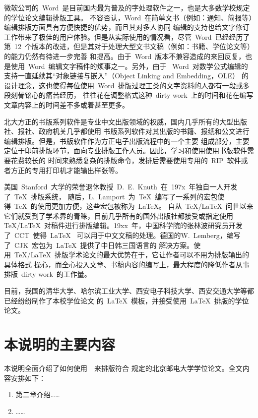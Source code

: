 微软公司的~Word~是目前国内最为普及的字处理软件之一，也是大多数学校规定的学位论文编辑排版工具。
不容否认，Word~在简单文书（例如：通知、简报等）编辑排版方面具有方便快捷的优势，而且其对多人协同
编辑的支持也给文字修订工作带来了极佳的用户体验。但是从实际使用的情况看，尽管~Word~已经经历了
第~12~个版本的改进，但是其对于处理大型文书文稿（例如：书籍、学位论文等）的能力仍然有待进一步完善
和提高。由于~Word~版本不兼容造成的来回反复，也是使用~Word~编辑文字稿件的烦事之一。另外，由于
~Word~对数学公式编辑的支持一直延续其“对象链接与嵌入”（Object Linking and Embedding，OLE）
的设计理念，这也使得每位使用~Word~排版过理工类的文字资料的人都有一段或多段刻骨铭心的痛苦经历，
往往花在调整格式这种~dirty work~上的时间和花在编写文章内容上的时间差不多或着甚至更多。

北大方正的书版系列软件是专业中文出版领域的权威，国内几乎所有的大型出版社、报社、政府机关几乎都使用
书版系列软件对其出版的书籍、报纸和公文进行编辑排版。但是，书版软件作为方正电子出版流程中的一个主要
组成部分，主要定位于印前排版环节，面向专业排版工作人员。因此，学习和使用使用书版软件需要花费较长的
时间来熟悉复杂的排版命令，发排后需要使用专用的~RIP~软件或者方正的专用打印机才能输出样张等。

美国~Stanford~大学的荣誉退休教授~D.~E.~Knuth~在~197x~年独自一人开发了~\TeX~排版系统，
随后，L.~Lamport~为~\TeX~编写了一系列的宏包使得~\TeX~的使用更加方便，这些宏包被称为~\LaTeX。
自从~\TeX/\LaTeX~问世以来它们就受到了学术界的青睐，目前几乎所有的国外出版社都接受或指定使用~
\TeX/\LaTeX~对稿件进行排版编辑。19xx~年，中国科学院的张林波研究员开发了~CCT~使得~\LaTeX~
可以用于中文文稿的处理。德国的W.~Lemberg，编写了~CJK~宏包为~\LaTeX~提供了中日韩三国语言的
解决方案。使用~\TeX/\LaTeX~排版学术论文的最大优势在于，它让作者可以不用为排版输出的具体格式
操心，而全心投入文章、书稿内容的编写上，最大程度的降低作者从事排版~dirty work~的工作量。

目前，我国的清华大学、哈尔滨工业大学、西安电子科技大学、西安交通大学等都已经纷纷制作了本校学位论文
的~\LaTeX~模板，并接受使用~\LaTeX~排版的学位论文。

\section{本说明的主要内容}
本说明全面介绍了如何使用~\BUPTThesis~来排版符合
规定的北京邮电大学学位论文。全文内容安排如下：

\begin{enumerate}
\item 第二章介绍……
\item ……
\end{enumerate}




